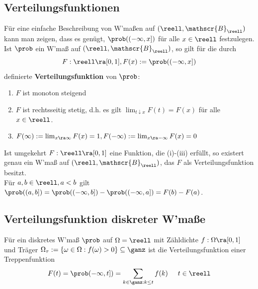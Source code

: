 \documentclass{kit}
\begin{document}
  \subsection{Verteilungsfunktionen}
    Für eine einfache Beschreibung von W'maßen auf $(\reell,\mathscr{B}_\reell)$ kann man zeigen, dass es genügt,
    $\prob((-\infty,x])$ für alle $x\in\reell$ festzulegen.\\
    Ist $\prob$ ein W'maß auf $(\reell,\mathscr{B}_\reell)$, so gilt für die durch
    $$F:\reell\ra[0,1],F(x):=\prob((-\infty,x])$$
    definierte \textbf{Verteilungsfunktion} von $\prob$:
    \begin{enumerate}[label=\roman*)]
      \item $F$ ist monoton steigend
      \item $F$ ist rechtsseitig stetig, d.h. es gilt $\lim_{t\downarrow x}F(t)=F(x)$ für alle $x\in\reell$.
      \item $F(\infty):=\lim_{x\ra\infty}F(x)=1,F(-\infty):=\lim_{x\ra-\infty}F(x)=0$
    \end{enumerate}
    Ist umgekehrt $F:\reell\ra[0,1]$ eine Funktion, die (i)-(iii) erfüllt, so existert genau ein W'maß auf 
    $(\reell,\mathscr{B}_\reell)$, das $F$ als Verteilungsfunktion besitzt.\\
    Für $a,b\in\reell,a<b$ gilt $\prob((a,b])=\prob((-\infty,b])-\prob((-\infty,a])=F(b)-F(a)$.
  \subsection{Verteilungsfunktion diskreter W'maße}
    Für ein diskretes W'maß $\prob$ auf $\Omega=\reell$ mit Zähldichte $f:\Omega\ra[0,1]$ und Träger 
    $\Omega_\tau:=\{\omega\in\Omega:f(\omega)>0\}\subseteq\ganz$ ist die Verteilungsfunktion einer Treppenfunktion
    $$F(t)=\prob(-\infty,t])=\sum_{k\in\ganz:k\le t}f(k)\hspace{0.5cm}t\in\reell$$
\end{document}
